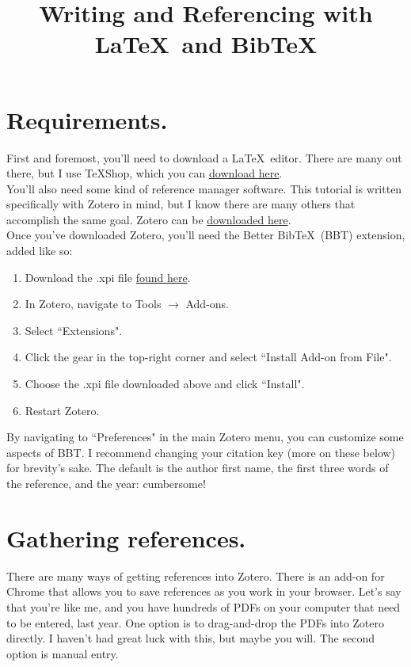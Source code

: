 \documentclass[11pt]{article}
\begin{document}
\title{Writing and Referencing with \LaTeX\ and Bib\TeX}
\maketitle
\section{Requirements.}

First and foremost, you'll need to download a \LaTeX \ editor. There are many out there, but I use \TeX Shop, which you can \href{https://pages.uoregon.edu/koch/texshop/obtaining.html}{download here}.\\

You'll also need some kind of reference manager software. This tutorial is written specifically with Zotero in mind, but I know there are many others that accomplish the same goal. Zotero can be \href{https://www.zotero.org/download/}{downloaded here}.\\

Once you've downloaded Zotero, you'll need the Better Bib\TeX\ (BBT) extension, added like so:
\begin{enumerate}
\item{Download the .xpi file \href{https://github.com/retorquere/zotero-better-bibtex/releases/tag/v5.2.20}{found here}.}
\item{In Zotero, navigate to Tools $\rightarrow$ Add-ons.}
\item{Select ``Extensions".}
\item{Click the gear in the top-right corner and select ``Install Add-on from File".}
\item{Choose the .xpi file downloaded above and click ``Install".}
\item{Restart Zotero.}
\end{enumerate}

By navigating to ``Preferences" in the main Zotero menu, you can customize some aspects of BBT. I recommend changing your citation key (more on these below) for brevity's sake.  The default is the author first name, the first three words of the reference, and the year: cumbersome!\\

\section{Gathering references.}

There are many ways of getting references into Zotero. There is an add-on for Chrome that allows you to save references as you work in your browser. Let's say that you're like me, and you have hundreds of PDFs on your computer that need to be entered, last year. One option is to drag-and-drop the PDFs into Zotero directly. I haven't had great luck with this, but maybe you will. The second option is manual entry.\\
\end{document}
